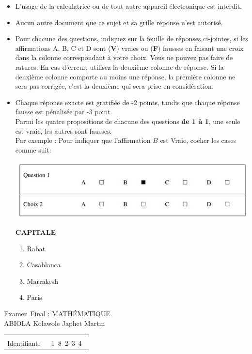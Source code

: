 \documentclass{book}%
\begin{document}
\begin{itemize}%
\item%
L'usage de la calculatrice ou de tout autre appareil électronique est interdit.%
\item%
Aucun autre document que ce sujet et sa grille réponse n'est autorisé.%
\item%
Pour chacune des questions, indiquez sur la feuille de réponses ci-jointes, si les affirmations A, B, C et D sont (\textbf{V}) vraies ou (\textbf{F}) fausses en faisant une croix dans la colonne correspondant à votre choix. Vous ne pouvez pas faire de ratures. En cas d'erreur, utilisez la deuxième colonne de réponse. Si la deuxième colonne comporte au moins une réponse, la première colonne ne sera pas corrigée, c'est la deuxième qui sera prise en considération.%
\item%
Chaque réponse exacte est gratifiée de -2 points, tandis que chaque réponse fausse est pénalisée par -3 point. \\ 	Parmi les quatre propositions de chacune des questions \textbf{de 1 à 1}, une seule est vraie, les autres sont fausses. \\ 	Par exemple : Pour indiquer que l'affirmation $B$ est Vraie, cocher les cases comme suit:  \\ \begin{center}	\includegraphics[scale=0.8]{reponses.png} \end{center}%
\thispagestyle{empty}%
\begin{exercise}%
\textbf{CAPITALE }%
\begin{enumerate}[label=\textbf{\Alph*. }]%
\item%
Rabat%
\item%
Casablanca%
\item%
Marrakesh%
\item%
Paris%
\end{enumerate}%
\end{exercise}%
\end{itemize}%
\newpage%
\thispagestyle{empty}%
Examen Final : MATHÉMATIQUE $\qquad \qquad \qquad \qquad \qquad \qquad \qquad \qquad$ ABIOLA Kolawole Japhet Martin%
\begin{flushright}%
\begin{tabular}{|l|}%
\hline%
 \\%
\thispagestyle{empty}%
Identifiant: $\quad$ {\Large 1~8~2~3~4~}%
 \\%
\hline%
\end{tabular}%
\end{flushright}%
\end{document}
